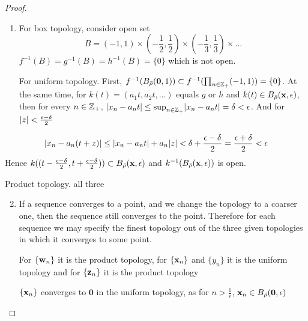 \documentclass[11pt]{article}
\begin{document}
\begin{proof}
\begin{enumerate}
\item For box topology, consider open set
\begin{equation*}
B=(-1,1)\times(-\frac{1}{2},\frac{1}{2})\times(-\frac{1}{3},\frac{1}{3})\times\dots
\end{equation*}
\(f^{-1}(B)=g^{-1}(B)=h^{-1}(B)=\{0\}\) which is not open.

For uniform topology. First, \(f^{-1}(B_{\bar{\rho}}(\textbf{0},1))\subset f^{-1}(\prod_{n\in\mathbb{Z}_+}(-1,1))=\{0\}\). At the
same time, for \(k(t)=(a_1t,a_2t,\dots)\) equals \(g\) or \(h\)
and \(k(t)\in B_{\bar{\rho}}(\operatorname{\textbf{x}},\epsilon)\), then for
every \(n\in\mathbb{Z}_+\),  \(\abs{x_n-a_nt}\le\sup_{n\in\Z_+}\abs{x_n-a_nt}=\delta<\epsilon\).
And
for \(\abs{z}<\frac{\epsilon-\delta}{2}\)
\end{enumerate}
\begin{equation*}
\abs{x_n-a_n(t+z)}\le\abs{x_n-a_nt}+a_n\abs{z}<\delta+\frac{\epsilon-\delta}{2}=\frac{\epsilon+\delta}{2}<\epsilon
\end{equation*}
Hence \(k((t-\frac{\epsilon-\delta}{2},t+\frac{\epsilon-\delta}{2}))\subset B_{\bar{\rho}}(\operatorname{\textbf{x}},\epsilon)\) and \(k^{-1}(B_{\bar{\rho}}(\operatorname{\textbf{x}},\epsilon))\)
is open.

Product topology. all three
\begin{enumerate}
\setcounter{enumi}{1}
\item If a sequence converges to a point, and we change the topology to a coarser one, then
the sequence still converges to the point. Therefore for each sequence we may specify the
finest topology out of the three given topologies in which it converges to some point.

For \(\{\operatorname{\textbf{w}}_n\}\) it is the product topology, for  \(\{\operatorname{\textbf{x}}_n\}\) and \(\{y_n\}\)  it is the uniform
topology and for \(\{\operatorname{\textbf{z}}_n\}\) it is the product topology

\(\{\operatorname{\textbf{x}}_n\}\) converges to \(\textbf{0}\) in the uniform topology, as
for \(n>\frac{1}{\epsilon}\), \(\operatorname{\textbf{x}}_n\in B_{\bar{\rho}}(\textbf{0},\epsilon)\)
\end{enumerate}
\end{proof}
\end{document}
